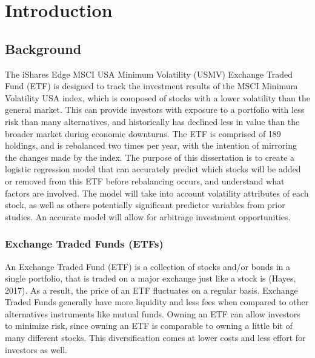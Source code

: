 \documentclass[12pt,twoside]{reedthesis}
\theoremstyle{definition}
\theoremstyle{definition}
\theoremstyle{definition}
\theoremstyle{remark}
\begin{document}
\mainmatter %
\pagestyle{fancyplain} %

\chapter{Introduction}\label{introduction}

\section{Background}\label{background}

The iShares Edge MSCI USA Minimum Volatility (USMV) Exchange Traded Fund
(ETF) is designed to track the investment results of the MSCI Minimum
Volatility USA index, which is composed of stocks with a lower
volatility than the general market. This can provide investors with
exposure to a portfolio with less risk than many alternatives, and
historically has declined less in value than the broader market during
economic downturns. The ETF is comprised of 189 holdings, and is
rebalanced two times per year, with the intention of mirroring the
changes made by the index. The purpose of this dissertation is to create
a logistic regression model that can accurately predict which stocks
will be added or removed from this ETF before rebalancing occurs, and
understand what factors are involved. The model will take into account
volatility attributes of each stock, as well as others potentially
significant predictor variables from prior studies. An accurate model
will allow for arbitrage investment opportunities.

\subsection{Exchange Traded Funds
(ETFs)}\label{exchange-traded-funds-etfs}

An Exchange Traded Fund (ETF) is a collection of stocks and/or bonds in
a single portfolio, that is traded on a major exchange just like a stock
is (Hayes, 2017). As a result, the price of an ETF fluctuates on a
regular basis. Exchange Traded Funds generally have more liquidity and
less fees when compared to other alternatives instruments like mutual
funds. Owning an ETF can allow investors to minimize risk, since owning
an ETF is comparable to owning a little bit of many different stocks.
This diversification comes at lower costs and less effort for investors
as well.
\end{document}
